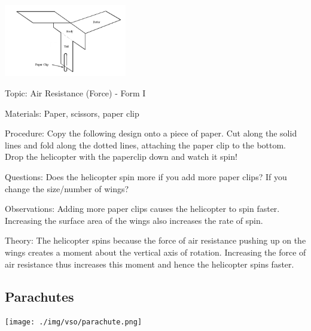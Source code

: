 \begin{multicols}{2}
\begin{center}
\includegraphics[width=0.4\textwidth]{./img/helicopter-2.png}
\end{center}

\begin{description*}
\item[Topic:]{Air Resistance (Force) - Form I}
\item[Materials:]{Paper, scissors, paper clip}
\item[Procedure:]{Copy the following design onto a piece of paper. Cut along the solid lines and fold along the dotted lines, attaching the paper clip to the bottom. Drop the helicopter with the paperclip down and watch it spin!}
\item[Questions:]{Does the helicopter spin more if you add more paper clips? If you change the size/number of wings?}
\item[Observations:]{Adding more paper clips causes the helicopter to spin faster. Increasing the surface area of the wings also increases the rate of spin.}
\item[Theory:]{The helicopter spins because the force of air resistance pushing up on the wings creates a moment about the vertical axis of rotation. Increasing the force of air resistance thus increases this moment and hence the helicopter spins faster.}
\end{description*}

\subsection{Parachutes}

\begin{center}
\texttt{[image: ./img/vso/parachute.png]}
\end{center}


\end{multicols}
